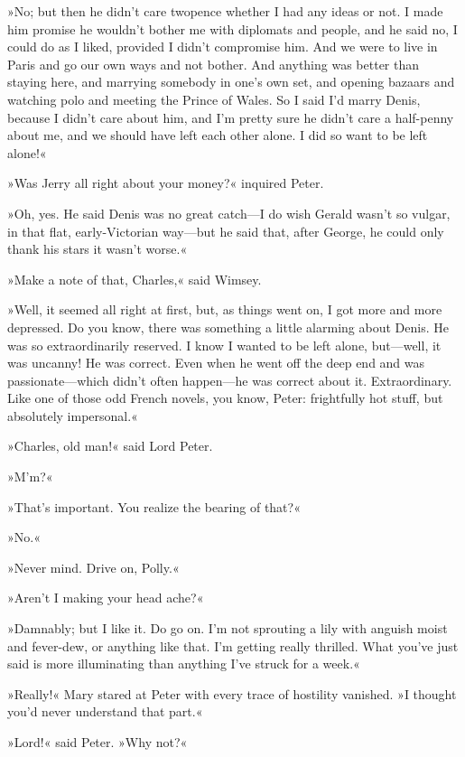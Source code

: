 »No; but then he didn't care twopence whether I had any ideas or not. I made him promise he wouldn't bother me with diplomats and people, and he said no, I could do as I liked, provided I didn't compromise him.  And we were to live in Paris and go our own ways and not bother. And anything was better than staying here, and marrying somebody in one's own set, and opening bazaars and watching polo and meeting the Prince of Wales. So I said I'd marry Denis, because I didn't care about him, and I'm pretty sure he didn't care a half-penny about me, and we should have left each other alone. I did so want to be left alone!«

»Was Jerry all right about your money?« inquired Peter.

»Oh, yes. He said Denis was no great catch\allowbreak---\allowbreak I do wish Gerald wasn't so vulgar, in that flat, early-Victorian way\allowbreak---\allowbreak but he said that, after George, he could only thank his stars it wasn't worse.«

»Make a note of that, Charles,« said Wimsey.

»Well, it seemed all right at first, but, as things went on, I got more and more depressed. Do you know, there was something a little alarming about Denis. He was so extraordinarily reserved. I know I wanted to be left alone, but\allowbreak---\allowbreak well, it was uncanny! He was correct. Even when he went off the deep end and was passionate\allowbreak---\allowbreak which didn't often happen\allowbreak---\allowbreak he was correct about it. Extraordinary. Like one of those odd French novels, you know, Peter: frightfully hot stuff, but absolutely impersonal.«

»Charles, old man!« said Lord Peter.

»M'm?«

»That's important. You realize the bearing of that?«

»No.«

»Never mind. Drive on, Polly.«

»Aren't I making your head ache?«

»Damnably; but I like it. Do go on. I'm not sprouting a lily with anguish moist and fever-dew, or anything like that. I'm getting really thrilled. What you've just said is more illuminating than anything I've struck for a week.«

»Really!« Mary stared at Peter with every trace of hostility vanished.  »I thought you'd never understand that part.«

»Lord!« said Peter. »Why not?«

